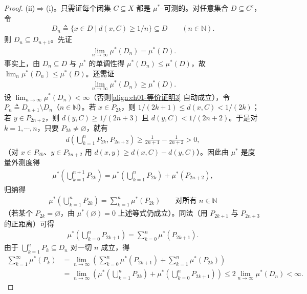 \documentclass[../../main.tex]{subfiles}%
\begin{document}
\begin{proof}
(ii)$\Rightarrow$(i)。只需证每个闭集 $C\subseteq X$ 都是 $\mu^*$--可测的。对任意集合 $D\subseteq C^c$，令
\begin{align*}
D_n\triangleq\{x\in D\mid d(x,C)\geqslant1/n\}\subseteq D\qquad(n\in\mathbb{N}).
\end{align*}
则 $D_n\subseteq D_{n+1}$。先证
\begin{align}
\lim_{n\to\infty}\mu^*(D_n)=\mu^*(D). \label{align:ch01-等价证明2}
\end{align}
事实上，由 $D_n\subseteq D$ 与 $\mu^*$ 的单调性得 $\mu^*(D_n)\leqslant\mu^*(D)$，故 $\lim_n\mu^*(D_n)\leqslant\mu^*(D)$。还需证
\begin{align}
\lim_{n\to\infty}\mu^*(D_n)\geqslant\mu^*(D). \label{align:ch01-等价证明3}
\end{align}
设 $\lim_{n\to\infty}\mu^*(D_n)<\infty$（否则\eqref{align:ch01-等价证明3} 自动成立），令 $P_n\triangleq D_{n+1}\setminus D_n$（$n\in\mathbb{N}$）。若 $x\in P_{2k}$，则 $1/(2k+1)\leqslant d(x,C)<1/(2k)$；若 $y\in P_{2n+2}$，则 $d(y,C)\geqslant1/(2n+3)$ 且 $d(y,C)<1/(2n+2)$。于是对 $k=1,\cdots ,n$，只要 $P_{2k}\neq\varnothing$，就有
\begin{align*}
d\left(\bigcup_{k=1}^nP_{2k},P_{2n+2}\right)\geqslant\frac{1}{2n+1}-\frac{1}{2n+2}>0,
\end{align*}
（对 $x\in P_{2k}$、$y\in P_{2n+2}$ 用 $d(x,y)\geqslant d(x,C)-d(y,C)$）。因此由 $\mu^*$ 是度量外测度得
\begin{align*}
\mu^*\left(\bigcup_{k=1}^{n+1}P_{2k}\right)=\mu^*\left(\bigcup_{k=1}^nP_{2k}\right)+\mu^*(P_{2n+2}),
\end{align*}
归纳得
\begin{align*}
\mu^*\left(\bigcup_{k=1}^nP_{2k}\right)=\sum_{k=1}^n\mu^*(P_{2k})\qquad\text{对所有 }n\in\mathbb{N}
\end{align*}
（若某个 $P_{2k}=\varnothing$，由 $\mu^*(\varnothing)=0$ 上述等式仍成立）。同法（用 $P_{2k+1}$ 与 $P_{2n+3}$ 的正距离）可得
\begin{align*}
\mu^*\left(\bigcup_{k=0}^nP_{2k+1}\right)=\sum_{k=0}^n\mu^*(P_{2k+1}).
\end{align*}
由于 $\bigcup_{k=1}^nP_k\subseteq D_n$ 对一切 $n$ 成立，得
\begin{align}
\sum_{k=1}^\infty\mu^*(P_k)
&=\lim_{n\to\infty}\left(\sum_{k=0}^n\mu^*(P_{2k+1})+\sum_{k=1}^n\mu^*(P_{2k})\right) \label{align:ch01-等价证明4}\\
&=\lim_{n\to\infty}\left(\mu^*\left(\bigcup_{k=1}^nP_{2k}\right)+\mu^*\left(\bigcup_{k=0}^nP_{2k+1}\right)\right)
\leqslant2\lim_{n\to\infty}\mu^*(D_n)<\infty. \nonumber

\end{align}
\end{proof}
\end{document}
